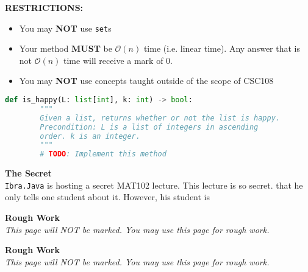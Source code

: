 \documentclass[letterpaper,12pt,addpoints]{exam}
\begin{document}
\begin{questions}
    \begin{center}
        
        \textbf{RESTRICTIONS:}
        \begin{itemize}
            \item You may \textbf{NOT} use \texttt{set}s
            \item Your method \textbf{MUST} be $\mathcal{O}(n)$ time (i.e. linear time). Any answer that is not $\mathcal{O}(n)$ time will receive a mark of 0.
            \item You may \textbf{NOT} use concepts taught outside of the scope of CSC108
        \end{itemize}
    \end{center}

    \begin{lstlisting}[language=Python, style=mystyle]
    def is_happy(L: list[int], k: int) -> bool:
        """
        Given a list, returns whether or not the list is happy.
        Precondition: L is a list of integers in ascending 
        order. k is an integer.
        """
        # TODO: Implement this method
    \end{lstlisting}

    \clearpage
    \question[10] \textbf{The Secret} \\
    \texttt{Ibra.Java} is hosting a secret MAT102 lecture. This lecture is so secret. that he only tells one student about it. However, his student is 


    \end{questions}

    \clearpage
    \begin{center}
        \textbf{Rough Work}\\
        \textit{This page will NOT be marked. You may use this page for rough work.}
    \end{center}

    \clearpage
    \begin{center}
        \textbf{Rough Work}\\
        \textit{This page will NOT be marked. You may use this page for rough work.}
    \end{center}
\end{document}
